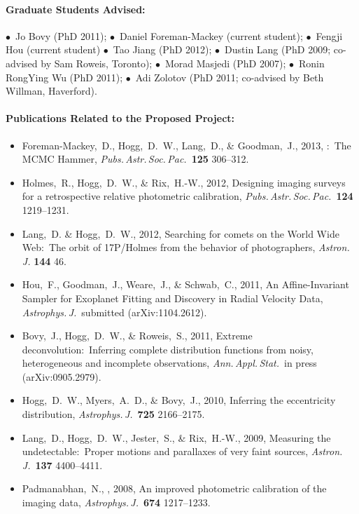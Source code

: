 \documentclass[letterpaper,12pt]{article}
\begin{document}
\paragraph{Graduate Students Advised:}
$\bullet$~Jo Bovy (PhD 2011);
$\bullet$~Daniel Foreman-Mackey (current student);
$\bullet$~Fengji Hou (current student)
$\bullet$~Tao Jiang (PhD 2012);
$\bullet$~Dustin Lang (PhD 2009; co-advised by Sam Roweis, Toronto);
$\bullet$~Morad Masjedi (PhD 2007);
$\bullet$~Ronin RongYing Wu (PhD 2011);
$\bullet$~Adi Zolotov (PhD 2011; co-advised by Beth Willman, Haverford).

\paragraph{Publications Related to the Proposed Project:}
\begin{itemize}\setlength{\itemsep}{0pt}
\item
Foreman-Mackey,~D., Hogg,~D.~W., Lang,~D., \& Goodman,~J., 2013,
{:\ The MCMC Hammer},
\textit{Pubs.\,Astr.\,Soc.\,Pac.}\ \textbf{125} 306--312.
\item
Holmes,~R., Hogg,~D.~W., \& Rix,~H.-W., 2012,
{Designing imaging surveys for a retrospective relative photometric calibration},
\textit{Pubs.\,Astr.\,Soc.\,Pac.}\ \textbf{124} 1219--1231.
\item
Lang,~D. \& Hogg,~D.~W., 2012,
{Searching for comets on the World Wide Web:\ The orbit of 17P/Holmes from the behavior of photographers},
\textit{Astron.\,J.} \textbf{144} 46.
\item
Hou,~F., Goodman,~J., Weare,~J., \& Schwab,~C., 2011, An
Affine-Invariant Sampler for Exoplanet Fitting and Discovery in Radial
Velocity Data, \textit{Astrophys.\,J.}\ submitted (arXiv:1104.2612).
\item
Bovy,~J., Hogg,~D.~W., \& Roweis,~S., 2011,
Extreme deconvolution:\ Inferring complete distribution functions
from noisy, heterogeneous and incomplete observations,
\textit{Ann.\,Appl.\,Stat.}\ in press (arXiv:0905.2979).
\item
Hogg,~D.~W., Myers,~A.~D., \& Bovy,~J., 2010, Inferring the
eccentricity distribution, \textit{Astrophys.\,J.}\ \textbf{725}
2166--2175.
\item
Lang,~D., Hogg,~D.~W., Jester,~S., \& Rix,~H.-W., 2009, Measuring the
undetectable:\ Proper motions and parallaxes of very faint sources,
\textit{Astron.\,J.}\ \textbf{137} 4400--4411.
\item
Padmanabhan,~N., \etal, 2008,
{An improved photometric calibration of the  imaging data},
\textit{Astrophys.\,J.}\ \textbf{674} 1217--1233.
\end{itemize}
\end{document}
